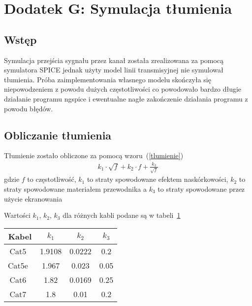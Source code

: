 \setcounter{secnumdepth}{0}
\section*{Dodatek G: Symulacja tłumienia}

\subsection{Wstęp}
Symulacja przejścia sygnału przez kanał została zrealizowana za pomocą symulatora
SPICE jednak użyty model linii transmisyjnej nie symulował tłumienia.
Próba zaimplementowania własnego modelu skończyła się niepowodzeniem z powodu
dużych częstotliwości co powodowało bardzo długie działanie programu ngspice i
ewentualne nagłe zakończenie działania programu z powodu błędów.

\subsection{Obliczanie tłumienia}
Tłumienie zostało obliczone za pomocą wzoru~(\ref{tlumienie})~\cite[sekcja 4.3.4.7]{TIA/EIA-568-B}
\begin{align}
    k_1 \cdot \sqrt{f} + k_2 \cdot f + \frac{k_3}{\sqrt{f}}\label{tlumienie}
\end{align}
gdzie $f$ to częstotliwość, $k_1$ to straty spowodowane efektem naskórkowości,
$k_2$ to straty spowodowane materiałem przewodnika a $k_3$ to straty spowodowane
przez użycie ekranowania

Wartości $k_1$, $k_2$, $k_3$ dla różnych kabli podane są w tabeli~\ref{tab:tlumienie}
\begin{table}
    \centering
    \begin{tabular}{c c c c}
        \toprule
        \textbf{Kabel} & \textbf{$k_1$} & \textbf{$k_2$} & \textbf{$k_3$} \\
        \toprule
        Cat5~\cite{IEEE-cabling} & 1.9108 & 0.0222 & 0.2 \\
        \midrule
        Cat5e~\cite[sekcja 4.3.4.7]{TIA/EIA-568-B} & 1.967 & 0.023 & 0.05 \\
        \midrule
        Cat6~\cite{IEEE-cabling} & 1.82 & 0.0169 & 0.25 \\
        \midrule
        Cat7~\cite{IEEE-cabling} & 1.8 & 0.01 & 0.2
    \end{tabular}\label{tab:tlumienie}
\end{table}
